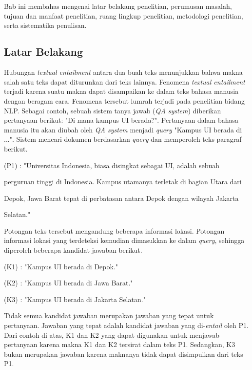 \chapter{\babSatu}
Bab ini membahas mengenai latar belakang penelitian, perumusan masalah, tujuan dan manfaat penelitian, ruang lingkup penelitian, metodologi penelitian, serta sistematika penulisan.

\section{Latar Belakang}

Hubungan \textit{textual entailment} antara dua buah teks menunjukkan bahwa makna salah satu teks dapat diturunkan dari teks lainnya. Fenomena \textit{textual entailment} terjadi karena suatu makna dapat disampaikan ke dalam teks bahasa manusia dengan beragam cara. Fenomena tersebut lumrah terjadi pada penelitian bidang NLP. Sebagai contoh, sebuah sistem tanya jawab (\textit{QA system}) diberikan pertanyaan berikut: "Di mana kampus UI berada?". Pertanyaan dalam bahasa manusia itu akan diubah oleh \textit{QA system} menjadi \textit{query} "Kampus UI berada di ...". Sistem mencari dokumen berdasarkan \textit{query} dan memperoleh teks paragraf berikut.

(P1) : "Universitas Indonesia, biasa disingkat sebagai UI, adalah sebuah

perguruan tinggi di Indonesia. Kampus utamanya terletak di bagian Utara dari

Depok, Jawa Barat tepat di perbatasan antara Depok dengan wilayah Jakarta

Selatan." 

\noindent Potongan teks tersebut mengandung beberapa informasi lokasi. Potongan informasi lokasi yang terdeteksi kemudian dimasukkan ke dalam \textit{query}, sehingga diperoleh beberapa kandidat jawaban berikut.

(K1) : "Kampus UI berada di Depok."

(K2) : "Kampus UI berada di Jawa Barat."

(K3) : "Kampus UI berada di Jakarta Selatan."

Tidak semua kandidat jawaban merupakan jawaban yang tepat untuk pertanyaan. Jawaban yang tepat adalah kandidat jawaban yang di-\textit{entail} oleh P1. Dari contoh di atas, K1 dan K2 yang dapat digunakan untuk menjawab pertanyaan karena makna K1 dan K2 tersirat dalam teks P1.  Sedangkan, K3 bukan merupakan jawaban karena maknanya tidak dapat disimpulkan dari teks P1.

